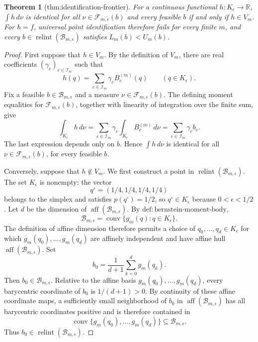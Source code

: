 \documentclass{article}
\newtheorem{theorem}{Theorem}
\begin{document}
\begin{theorem}[thm:identification-frontier]\label{thm:identification-frontier}
For a continuous functional \(h:K_{\epsilon}\to\mathbb R\), \(\int h\,d\nu\) is identical for all \(\nu\in\mathcal F_{m,\epsilon}(b)\) and every feasible \(b\) if and only if \(h\in V_m\). For \(h=f\), universal point identification therefore fails for every finite \(m\), and every \(b\in\operatorname{relint}(\mathcal B_{m,\epsilon})\) satisfies \(L_m(b)<U_m(b)\).
\end{theorem}
\begin{proof}
First suppose that \(h\in V_m\). By the definition of \(V_m\), there are real coefficients \((\gamma_c)_{c\in\mathcal I_m}\) such that
\[
h(q)=\sum_{c\in\mathcal I_m}\gamma_c B_c^{(m)}(q)
\qquad(q\in K_{\epsilon}).
\]
Fix a feasible \(b\in\mathcal B_{m,\epsilon}\) and a measure \(\nu\in\mathcal F_{m,\epsilon}(b)\). The defining moment equalities for \(\mathcal F_{m,\epsilon}(b)\), together with linearity of integration over the finite sum, give
\[
\int_{K_{\epsilon}}h\,d\nu
=\sum_{c\in\mathcal I_m}\gamma_c
  \int_{K_{\epsilon}}B_c^{(m)}\,d\nu
=\sum_{c\in\mathcal I_m}\gamma_c b_c.
\]
The last expression depends only on \(b\). Hence \(\int h\,d\nu\) is identical for all \(\nu\in\mathcal F_{m,\epsilon}(b)\), for every feasible \(b\).

Conversely, suppose that \(h\notin V_m\). We first construct a point in \(\operatorname{relint}(\mathcal B_{m,\epsilon})\). The set \(K_{\epsilon}\) is nonempty: the vector
\[
q^{\circ}=(1/4,1/4,1/4,1/4)
\]
belongs to the simplex and satisfies \(p(q^{\circ})=1/2\), so \(q^{\circ}\in K_{\epsilon}\) because \(0<\epsilon<1/2\). Let \(d\) be the dimension of \(\operatorname{aff}(\mathcal B_{m,\epsilon})\). By \(\mathrm{def{:}bernstein\text{-}moment\text{-}body}\),
\[
\mathcal B_{m,\epsilon}
=\operatorname{conv}\{g_m(q):q\in K_{\epsilon}\}.
\]
The definition of affine dimension therefore permits a choice of \(q_0,\ldots,q_d\in K_{\epsilon}\) for which \(g_m(q_0),\ldots,g_m(q_d)\) are affinely independent and have affine hull \(\operatorname{aff}(\mathcal B_{m,\epsilon})\). Set
\[
b_0=\frac{1}{d+1}\sum_{k=0}^{d}g_m(q_k).
\]
Then \(b_0\in\mathcal B_{m,\epsilon}\). Relative to the affine basis \(g_m(q_0),\ldots,g_m(q_d)\), every barycentric coordinate of \(b_0\) is \(1/(d+1)>0\). By continuity of these affine coordinate maps, a sufficiently small neighborhood of \(b_0\) in \(\operatorname{aff}(\mathcal B_{m,\epsilon})\) has all barycentric coordinates positive and is therefore contained in
\[
\operatorname{conv}\{g_m(q_0),\ldots,g_m(q_d)\}
\subseteq\mathcal B_{m,\epsilon}.
\]
Thus \(b_0\in\operatorname{relint}(\mathcal B_{m,\epsilon})\).


\end{proof}
\end{document}
